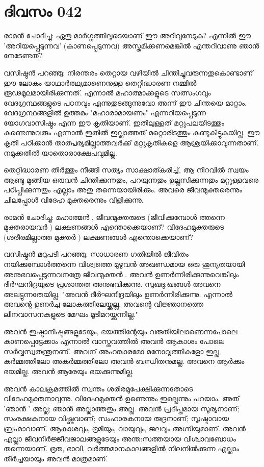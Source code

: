  
\section{ദിവസം 042}


രാമന്‍ ചോദിച്ചു: ഏതു മാര്‍ഗ്ഗത്തിലൂടെയാണ്‌ ഈ അറിവുനേടുക? എന്നില്‍ ഈ 'അറിയപ്പെടുന്നവ' (കാണപ്പെടുന്നവ) അസ്തമിക്കണമെങ്കില്‍ എന്തറിവാണു ഞാന്‍ നേടേണ്ടത്‌?

വസിഷ്ഠന്‍ പറഞ്ഞു: നിരന്തരം തെറ്റായ വഴിയില്‍ ചിന്തിച്ചുവരുന്നതുകൊണ്ടാണ്‌ ഈ ലോകം  യാഥാർത്ഥ്യമാണെനുള്ള തെറ്റിദ്ധാരണ നമ്മില്‍ രൂഢമൂലമായിരിക്കുന്നത്‌. എന്നാല്‍ മഹാത്മാക്കളുടെ സത്സംഗവും വേദഗ്രന്ഥങ്ങളുടെ പഠനവും എന്നുതുടങ്ങുന്നുവോ അന്ന് ഈ ചിന്തയെ മാറ്റാം. വേദഗ്രന്ഥങ്ങളില്‍ ഉത്തമം "മഹാരാമായണം" എന്നറിയപ്പെടുന്ന യോഗവാസിഷ്ഠം എന്ന ഈ കൃതിയാണ്‌. ഇതിലുള്ളത്‌ മറ്റുപലയിടത്തും കണ്ടെന്നുവരും എന്നാല്‍ ഇതില്‍ ഇല്ലാത്തത്‌ മറ്റൊരിടത്തും കണ്ടുകിട്ടുകയില്ല. ഈ കൃതി പഠിക്കാന്‍ താത്പ്പര്യമില്ലാത്തവര്‍ക്ക്‌ മറ്റുകൃതികളെ ആശ്രയിക്കാവുന്നതാണ്‌. നമുക്കതില്‍ യാതൊരാക്ഷേപവുമില്ല.

തെറ്റിദ്ധാരണ തീര്‍ത്തും നീങ്ങി സത്യം സാക്ഷാത്കരിച്ച്‌, ആ നിറവില്‍ സ്വയം ആണ്ടു മുങ്ങിയ ഒരുവന്‍ ചിന്തിക്കുന്നതും, പറയുന്നതും ഉല്ലസിക്കുന്നതും മറ്റുള്ളവരെ പഠിപ്പിക്കുന്നതും എല്ലാം അതു തന്നെയായിരിക്കും. അവരെ ജീവന്മുക്തരെന്നും ചിലപ്പോള്‍ വിദേഹ മുക്തരെന്നും വിളിക്കുന്നു.

രാമന്‍ ചോദിച്ചു: മഹാത്മന്‍ , ജീവന്മുക്തരുടെ (ജീവിക്കുമ്പോള്‍ ത്തന്നെ മുക്തരായവര്‍ ) ലക്ഷണങ്ങള്‍ എന്തൊക്കെയാണ്‌? വിദേഹമുക്തരുടെ (ശരീരമില്ലാത്ത മുക്തര്‍ )  ലക്ഷണങ്ങള്‍ എന്തൊക്കെയാണ്‌?

വസിഷ്ഠന്‍ മറുപടി പറഞ്ഞു: സാധാരണ ഗതിയില്‍ ജീവിതം നയിക്കുമ്പോള്‍ത്തന്നെ വിശ്വത്തെ മുഴുവന്‍ അഖണ്ഡമായ ഒരു ശൂന്യതയായി അനുഭവപ്പെടുന്നവനത്രേ ജീവന്മുക്തന്‍ . അവന്‍ ഉണര്‍ന്നിരിക്കുന്നുവെങ്കിലും ദീര്‍ഘനിദ്രയുടെ പ്രശാന്തത അനുഭവിക്കുന്നു. സുഖദു:ഖങ്ങള്‍ അവനെ അലട്ടുന്നതേയില്ല. "അവന്‍ ദീര്‍ഘനിദ്രയിലും ഉണര്‍ന്നിരിക്കുന്നു. എന്നാല്‍ അവന്റെ ഉണര്‍ച്ച ലോകത്തിലേയ്ക്കല്ല. അവന്റെ വിജ്ഞാനത്തെ ലീനവാസനകളുടെ മേഘം മൂടിമറയ്ക്കുന്നില്ല."

അവന്‍ ഇഷ്ടാനിഷ്ടങ്ങളുടേയും, ഭയത്തിന്റേയും വരുതിയിലാണെന്നപോലെ കാണപ്പെട്ടേക്കാം എന്നാല്‍ വാസ്തവത്തില്‍ അവന്‍ ആകാശം പോലെ സര്‍വ്വസ്വതന്ത്രനണ്‌. അവന്‌ അഹങ്കാരമോ മനോവൃത്തികളോ ഇല്ല. കര്‍മ്മത്തിലോ അകര്‍മ്മത്തിലോ അവന്‍ ബന്ധിതനുമല്ല. അവനെ ആര്‍ക്കും ഭയമില്ല. അവന്‍ ആരേയും ഭയക്കുന്നുമില്ല. 

അവന്‍ കാലക്രമത്തില്‍ സ്വന്തം ശരീരമുപേക്ഷിക്കുന്നതോടെ വിദേഹമുക്തനാവുന്നു. വിദേഹമുക്തന്‍ ഉണ്ടെന്നും ഇല്ലെന്നും പറയാം. അത്‌  'ഞാന്‍ ' അല്ല; ഞാന്‍ അല്ലാത്തതും അല്ല. അവന്‍ പ്രദീപ്തമായ സൂര്യനാണ്‌; സംരക്ഷകനായ വിഷ്ണുവാണ്‌; സംഹാരകനായ രുദ്രനാണ്‌; സൃഷ്ടാവായ ബ്രഹ്മാവാണ്‌. ആകാശവും, ഭൂമിയും, വായുവും, ജലവും അഗ്നിയുമാണ്‌. അവന്‍ എല്ലാ ജീവനിര്‍ജ്ജീവജാലങ്ങളുടേയും അന്ത:സത്തയായ വിശ്വാവബോധം തന്നെയാണ്‌. ഭൂത, ഭാവി, വര്‍ത്തമാനകാലങ്ങളില്‍ നിലനില്‍ക്കുന്ന എല്ലാം തീര്‍ച്ചയായും അവന്‍ മാത്രമാണ്‌.

